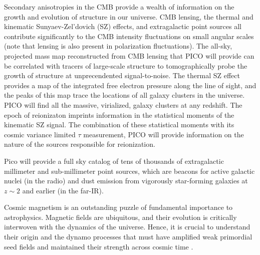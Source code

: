 \documentclass[PICOReport.tex]{subfiles}
\begin{document}
  Secondary anisotropies in the CMB provide
a wealth of information on the growth and evolution of structure in our universe.
CMB lensing, the thermal and kinematic Sunyaev-Zel'dovich (SZ)
effects, and extragalactic point sources all contribute significantly
to the CMB intensity fluctuations on small angular scales (note that
lensing is also present in polarization fluctuations). The all-sky,
projected mass map reconstructed from CMB lensing that PICO will
provide can be correlated with tracers of large-scale structure to
tomographically probe the growth of structure at unprecendented
signal-to-noise. The thermal SZ effect provides a map of the
integrated free electron pressure along the line of sight, and the
peaks of this map trace the locations of all galaxy clusters in the
universe. PICO will find all the massive, virialized, galaxy clusters
at any redshift.  The epoch of reionizaton imprints information in the
statistical moments of the kinematic SZ signal.  The combination of
these statistical moments with its cosmic variance limited $\tau$
measurement, PICO will provide information on the nature of the
sources responsible for reionization.

Pico will provide a full sky catalog of tens of thousands of
extragalactic millimeter and sub-millimeter point sources, which are
beacons for active galactic nuclei (in the radio) and dust emission
from vigorously star-forming galaxies at $z \sim 2$ and earlier (in
the far-IR).

Cosmic magnetism is an outstanding puzzle of fundamental importance to astrophysics. Magnetic fields are ubiquitous, and their evolution is critically interwoven with the dynamics of the universe. Hence, it is crucial to understand
their origin and the dynamo processes that must have amplified weak  primordial seed fields 
and maintained their strength across cosmic time \citep{Brandenburg2005}. 
\end{document}
